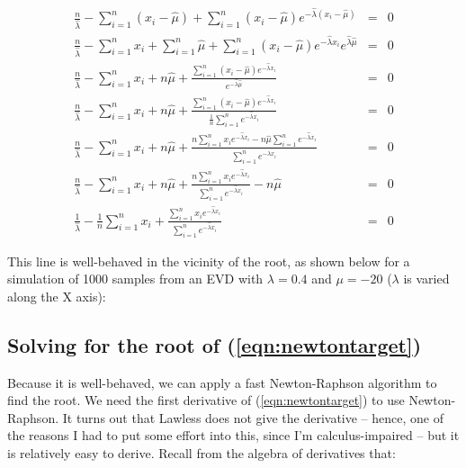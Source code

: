 \begin{eqnarray}
\frac{n}{\hat{\lambda}} - \sum_{i=1}^{n} (x_i - \hat{\mu}) +  
\sum_{i=1}^{n} (x_i - \hat{\mu}) e^{-\hat{\lambda} (x_i - \hat{\mu})} 
& = & 0
\nonumber \\
%
\frac{n}{\hat{\lambda}} - \sum_{i=1}^{n} x_i + \sum_{i=1}^{n} \hat{\mu} +
\sum_{i=1}^{n} (x_i - \hat{\mu}) e^{-\hat{\lambda} x_i} e^{\hat{\lambda}\hat{\mu}} 
& = & 0
\nonumber \\
%
\frac{n}{\hat{\lambda}} - \sum_{i=1}^{n} x_i + n \hat{\mu} +
\frac{\sum_{i=1}^{n} (x_i - \hat{\mu}) e^{-\hat{\lambda} x_i}} 
     {e^{-\hat{\lambda}\hat{\mu}}}
& = & 0
\nonumber \\
%
\frac{n}{\hat{\lambda}} - \sum_{i=1}^{n} x_i + n \hat{\mu} +
\frac{\sum_{i=1}^{n} (x_i - \hat{\mu}) e^{-\hat{\lambda} x_i}} 
     {\frac{1}{n} \sum_{i=1}^{n} e^{-\hat{\lambda} x_i}}
& = & 0
\nonumber \\
%
\frac{n}{\hat{\lambda}} - \sum_{i=1}^{n} x_i + n \hat{\mu} +
\frac{n \sum_{i=1}^{n} x_i e^{-\hat{\lambda} x_i} - n \hat{\mu} \sum_{i=1}^{n}
e^{-\hat{\lambda} x_i}}
     {\sum_{i=1}^{n} e^{-\hat{\lambda} x_i}}
& = & 0
\nonumber \\
%
\frac{n}{\hat{\lambda}} - \sum_{i=1}^{n} x_i + n \hat{\mu} +
\frac{n \sum_{i=1}^{n} x_i e^{-\hat{\lambda} x_i}}
     {\sum_{i=1}^{n} e^{-\hat{\lambda} x_i}} 
- n\hat{\mu}
& = & 0
\nonumber \\
%
\frac{1}{\hat{\lambda}} - \frac{1}{n} \sum_{i=1}^{n} x_i +
\frac{\sum_{i=1}^{n} x_i e^{-\hat{\lambda} x_i}}
     {\sum_{i=1}^{n} e^{-\hat{\lambda} x_i}} 
& = & 0
\label{eqn:newtontarget}
\end{eqnarray}

This line is well-behaved in the vicinity of the root, as shown below
for a simulation of 1000 samples from an EVD with $\lambda = 0.4$ and
$\mu = -20$ ($\lambda$ is varied along the X axis):

\centerline{
}

\subsection{Solving for the root of (\ref{eqn:newtontarget})}

Because it is well-behaved, we can apply a fast Newton-Raphson
algorithm to find the root. We need the first derivative of
(\ref{eqn:newtontarget}) to use Newton-Raphson. It turns out that
Lawless does not give the derivative -- hence, one of the reasons I
had to put some effort into this, since I'm calculus-impaired -- but
it is relatively easy to derive. Recall from the algebra of
derivatives that:

